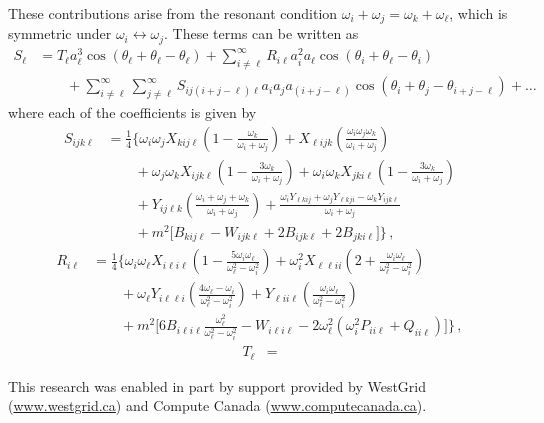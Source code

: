 \documentclass[letterpaper,11pt]{article}
\newcommand{\oi}{\omega_i}
\newcommand{\oj}{\omega_j}
\newcommand{\ok}{\omega_k}
\newcommand{\ol}{\omega_\ell}
\newcommand{\thi}{\theta_i}
\newcommand{\thj}{\theta_j}
\newcommand{\thl}{\theta_\ell}
\begin{document}
These contributions arise from the resonant condition $\oi + \oj = \ok + \ol$, which is symmetric under $\oi \leftrightarrow \oj$. These terms can be written as
\begin{align}
S_\ell &= T_\ell a^3_\ell \cos (\thl + \thl - \thl) + \sum_{i \neq \ell}^\infty R_{i \ell} a^2_i a_\ell \cos(\thi + \thl - \thi) \nonumber \\
& \qquad + \sum_{i \neq \ell}^\infty \sum_{j \neq \ell}^\infty S_{i j (i + j - \ell) \ell} a_i a_j a_{(i + j - \ell)} \cos(\thi + \thj - \theta_{i + j -\ell} ) + \ldots
\end{align}
where each of the coefficients is given by
\begin{align}
S_{ijk\ell} &= \frac{1}{4} \bigg\{ \oi \oj X_{kij\ell} \left( 1 - \frac{\ok}{\oi + \oj} \right) + X_{\ell ijk} \left( \frac{\oi \oj \ok}{\oi + \oj}\right) \nonumber \\
%
& \qquad + \oj \ok X_{ijk\ell} \left( 1 - \frac{3\ok}{\oi + \oj} \right) + \oi \ok X_{jki\ell} \left( 1 - \frac{3\ok}{\oi + \oj} \right) \nonumber \\
%
& \qquad + Y_{ij\ell k} \left( \frac{\oi + \oj + \ok}{\oi + \oj} \right) + \frac{\oi Y_{\ell k i j} + \oj Y_{\ell k j i} - \ok Y_{ijk\ell}}{\oi + \oj} \nonumber \\
%
& \qquad + m^2 \Big[ B_{kij\ell} - W_{ijk\ell} + 2B_{ijk\ell} + 2B_{jki\ell} \Big] \bigg\} \, ,
\end{align}
\begin{align}
R_{i\ell} &= \frac{1}{4} \bigg\{ \oi \ol X_{i\ell i \ell} \left( 1 - \frac{5 \oi\ol}{\ol^2 - \oi^2} \right) + \oi^2 X_{\ell \ell i i} \left( 2 + \frac{\oi \ol}{\ol^2 - \oi^2} \right) \nonumber \\
%
& \qquad + \ol Y_{i \ell \ell i} \left( \frac{4\ol - \oi}{\ol^2 - \oi^2} \right) + Y_{\ell i i \ell} \left( \frac{\oi \ol}{\ol^2 - \oi^2} \right) \nonumber \\
%
& \qquad + m^2 \Big[ 6 B_{i\ell i \ell} \frac{\ol^2}{\ol^2 - \oi^2}  - W_{i\ell i \ell} - 2\ol^2 (\oi^2 P_{ii\ell} + Q_{ii\ell} ) \Big] \bigg\} \, ,
\end{align}
\begin{align}
T_{\ell} &= 
\end{align}


\acknowledgments

This research was enabled in part by support provided by WestGrid (\href{www.westgrid.ca}{www.westgrid.ca}) and Compute Canada (\href{www.computecanada.ca}{www.computecanada.ca}).



%

\end{document}
